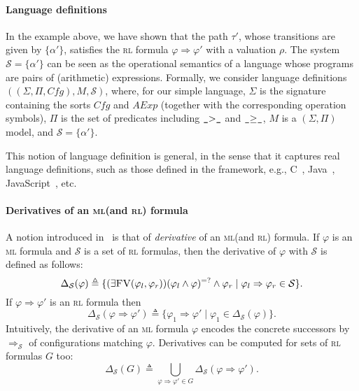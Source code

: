 \documentclass[conference]{IEEEtran}
\newenvironment{todo}{\medskip\hrule\smallskip\noindent}{\smallskip\hrule\medskip}
\newcommand{\dl}[1]{\begin{todo}\textcolor{blue}{Dorel:}\\ \color{red}{#1}\color{black}\end{todo}}
\newcommand{\vr}[1]{\begin{todo}\textcolor{blue}{Vlad:}\\ \color{orange}{#1}\color{black}\end{todo}}
\newcommand{\dl}[1]{}
\newcommand{\vr}[1]{}
\newcommand{\Cfg}{\mathit{Cfg}}
\newcommand{\M}{\mathit{M}}
\newcommand{\eqbydef}{\triangleq}
\renewcommand{\S}{\mathcal{S}}
\newcommand{\tran}[2]{\Ra^{\!#1}_{\!#2}}
\newcommand{\Ra}{\Rightarrow}
\newcommand{\FreeVars}{\mathit{\textsc{FV}}}
\newcommand{\ML}{\textsc{ml}\xspace}
\newcommand{\RL}{\textsc{rl}\xspace}
\newcommand{\rrule}[2]{{#1} \Ra{#2}}
\newcommand{\rarule}[2]{{#1} \Ra{#2}}
\begin{document}
\paragraph{Language definitions} 
In the example above, we have shown that the path $\tau'$, whose transitions are given by $\{ \alpha' \}$, satisfies the \RL formula $\rrule{\varphi}{\varphi'}$ with a valuation $\rho$.
The system $\S=\{\alpha'\}$ can be seen as the operational semantics of a language  whose programs are pairs of (arithmetic) expressions.
Formally, we consider language definitions $((\Sigma, \Pi, \Cfg),\M, \S)$, where, for our simple language, $\Sigma$ is the signature containing the sorts $\Cfg$ and $\mathit{A\!Exp}$ (together with the corresponding operation symbols), $\Pi$ is the set of predicates including $\mathrel{\text{\ttfamily \_}}>\mathrel{\text{\ttfamily \_}}$ and $\mathrel{\text{\ttfamily \_}}\geq\mathrel{\text{\ttfamily \_}}$, $\M$ is a $(\Sigma, \Pi)$ model, and $\S = \{ \alpha' \}$.

This notion of language definition is general, in the sense that it captures real language definitions, such as those defined in the \K framework, e.g., C~\cite{ellison-rosu-2012-popl,hathhorn-ellison-rosu-2015-pldi}, Java~\cite{bogdanas-rosu-2015-popl}, JavaScript~\cite{park-stefanescu-rosu-2015-pldi}, etc.
 


\paragraph{Derivatives of an \ML (and \RL) formula}
A notion introduced in~\cite{lucanu-rusu-arusoaie-nowak-LRC2015} is that of \emph{derivative} of an \ML (and \RL) formula.
If $\varphi$ is an \ML formula and $\S$ is a set of \RL formulas, then the derivative of $\varphi$ with $\S$ is defined as follows:
$$
\Delta_\S(\varphi)\eqbydef\{(\exists \FreeVars(\varphi_l,\varphi_r))(\varphi_l\land\varphi)^{=?}\land\varphi_r\mid\rrule{\varphi_l}{\varphi_r}\in\S\}.
$$
If $\rarule{\varphi}{\varphi'}$ is an \RL formula then
$$
\Delta_\S(\rarule{\varphi}{\varphi'}) \eqbydef \{\rarule{\varphi_1}{\varphi'}\mid\varphi_1\in\Delta_\S(\varphi)\}.
$$
Intuitively, the derivative of an \ML formula $\varphi$ encodes the concrete successors by $\tran{}{\S}$ of configurations matching $\varphi$.
Derivatives can be computed for sets of \RL formulas $G$ too:  
$$\Delta_\S(G) \eqbydef \bigcup_{\rrule{\varphi}{\varphi'}\in G} \Delta_\S(\rrule{\varphi}{\varphi'}).$$
\end{document}
